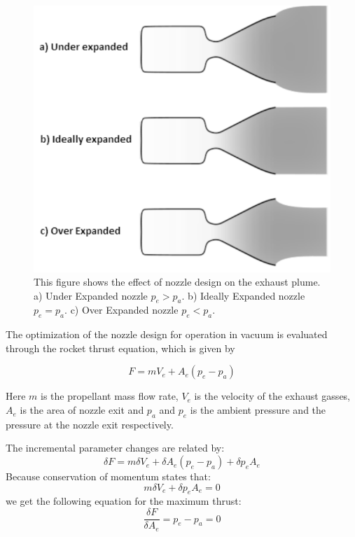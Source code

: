 \begin{figure}[htb]
\begin{center}
\includegraphics[scale=0.7]{figures/navtheory/nozzle}
\caption{This figure shows the effect of nozzle design on the exhaust plume. a) Under Expanded nozzle $p_e>p_a$. b) Ideally Expanded nozzle $p_e=p_a$. c) Over Expanded nozzle $p_e<p_a$. }
\label{fig:jetflows}
\end{center}
\end{figure}

The optimization of the nozzle design for operation in vacuum is evaluated through the rocket thrust equation, which is given by \cite{spacecraft}

\begin{equation}
F=mV_e+A_e(p_e-p_a)
\end{equation}

\noindent
Here $m$ is the propellant mass flow rate,  $V_e$ is the velocity of the exhaust gasses, $A_e$ is the area of nozzle exit and $p_a$ and $p_e$ is the ambient pressure and the pressure at the nozzle exit respectively. 

The incremental parameter changes are related by:
\begin{equation}
\delta F=m\delta V_e +\delta A_e(p_e-p_a) +\delta p_e A_e
\end{equation}
Because conservation of momentum states that:
\begin{equation}
m\delta V_e+\delta p_e A_e=0
\end{equation}
we get the following equation for the maximum thrust:
\begin{equation}
\dfrac{\delta F}{\delta A_e}=p_e-p_a=0 
\end{equation}

